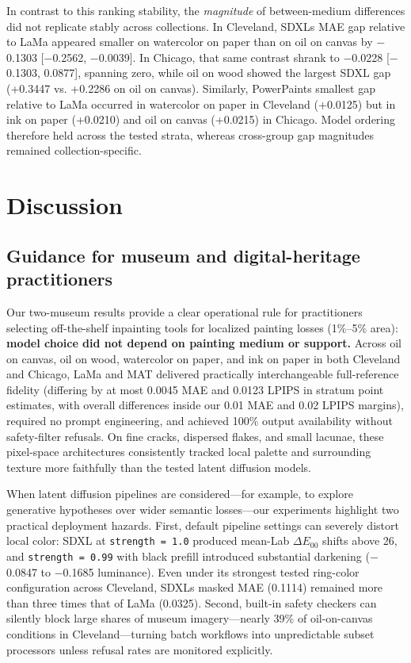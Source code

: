\documentclass[applsci,article,submit,pdftex,moreauthors]{Definitions/mdpi}
\begin{document}
In contrast to this ranking stability, the \emph{magnitude} of between-medium differences did not replicate stably across collections. In Cleveland, SDXL\textquotesingle s MAE gap relative to LaMa appeared smaller on watercolor on paper than on oil on canvas by \ensuremath{-}0.1303 {[}\ensuremath{-}0.2562, \ensuremath{-}0.0039{]}. In Chicago, that same contrast shrank to \ensuremath{-}0.0228 {[}\ensuremath{-}0.1303, 0.0877{]}, spanning zero, while oil on wood showed the largest SDXL gap (+0.3447 vs. +0.2286 on oil on canvas). Similarly, PowerPaint\textquotesingle s smallest gap relative to LaMa occurred in watercolor on paper in Cleveland (+0.0125) but in ink on paper (+0.0210) and oil on canvas (+0.0215) in Chicago. Model ordering therefore held across the tested strata, whereas cross-group gap magnitudes remained collection-specific.

\section{Discussion}\label{discussion}

\subsection{Guidance for museum and digital-heritage practitioners}\label{guidance-for-museum-and-digital-heritage-practitioners}

Our two-museum results provide a clear operational rule for practitioners selecting off-the-shelf inpainting tools for localized painting losses (1\%--5\% area): \textbf{model choice did not depend on painting medium or support.} Across oil on canvas, oil on wood, watercolor on paper, and ink on paper in both Cleveland and Chicago, LaMa and MAT delivered practically interchangeable full-reference fidelity (differing by at most 0.0045 MAE and 0.0123 LPIPS in stratum point estimates, with overall differences inside our 0.01 MAE and 0.02 LPIPS margins), required no prompt engineering, and achieved 100\% output availability without safety-filter refusals. On fine cracks, dispersed flakes, and small lacunae, these pixel-space architectures consistently tracked local palette and surrounding texture more faithfully than the tested latent diffusion models.

When latent diffusion pipelines are considered---for example, to explore generative hypotheses over wider semantic losses---our experiments highlight two practical deployment hazards. First, default pipeline settings can severely distort local color: SDXL at \texttt{strength\ =\ 1.0} produced mean-Lab \texttt{\ensuremath{\Delta E_{00}}} shifts above 26, and \texttt{strength\ =\ 0.99} with black prefill introduced substantial darkening (\ensuremath{-}0.0847 to \ensuremath{-}0.1685 luminance). Even under its strongest tested ring-color configuration across Cleveland, SDXL\textquotesingle s masked MAE (0.1114) remained more than three times that of LaMa (0.0325). Second, built-in safety checkers can silently block large shares of museum imagery---nearly 39\% of oil-on-canvas conditions in Cleveland---turning batch workflows into unpredictable subset processors unless refusal rates are monitored explicitly.
\end{document}
